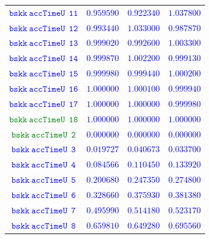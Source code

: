 \documentclass[10pt,a4paper]{article}
\begin{document}
\begin{table}[h!]
{\begin{tabular}{cccc}
\textcolor{blue}{$\mathtt{bskk~accTimeU~~11}$} & \textcolor{blue}{$0.959590$}& \textcolor{blue}{$0.922340$}& \textcolor{blue}{$1.037800$}\\
\textcolor{blue}{$\mathtt{bskk~accTimeU~~12}$} & \textcolor{blue}{$0.993440$}& \textcolor{blue}{$1.033000$}& \textcolor{blue}{$0.987870$}\\
\textcolor{blue}{$\mathtt{bskk~accTimeU~~13}$} & \textcolor{blue}{$0.999020$}& \textcolor{blue}{$0.992600$}& \textcolor{blue}{$1.003300$}\\
\textcolor{blue}{$\mathtt{bskk~accTimeU~~14}$} & \textcolor{blue}{$0.999870$}& \textcolor{blue}{$1.002200$}& \textcolor{blue}{$0.999130$}\\
\textcolor{blue}{$\mathtt{bskk~accTimeU~~15}$} & \textcolor{blue}{$0.999980$}& \textcolor{blue}{$0.999440$}& \textcolor{blue}{$1.000200$}\\
\textcolor{blue}{$\mathtt{bskk~accTimeU~~16}$} & \textcolor{blue}{$1.000000$}& \textcolor{blue}{$1.000100$}& \textcolor{blue}{$0.999940$}\\
\textcolor{blue}{$\mathtt{bskk~accTimeU~~17}$} & \textcolor{blue}{$1.000000$}& \textcolor{blue}{$1.000000$}& \textcolor{blue}{$0.999980$}\\
\textcolor{Green}{$\mathtt{bskk~accTimeU~~18}$} & \textcolor{blue}{$1.000000$}& \textcolor{blue}{$1.000000$}& \textcolor{blue}{$1.000000$}\\
\textcolor{Green}{$\mathtt{bskk~accTimeU~~2}$} & \textcolor{blue}{$0.000000$}& \textcolor{blue}{$0.000000$}& \textcolor{blue}{$0.000000$}\\
\textcolor{blue}{$\mathtt{bskk~accTimeU~~3}$} & \textcolor{blue}{$0.019727$}& \textcolor{blue}{$0.040673$}& \textcolor{blue}{$0.033700$}\\
\textcolor{blue}{$\mathtt{bskk~accTimeU~~4}$} & \textcolor{blue}{$0.084566$}& \textcolor{blue}{$0.110450$}& \textcolor{blue}{$0.133920$}\\
\textcolor{blue}{$\mathtt{bskk~accTimeU~~5}$} & \textcolor{blue}{$0.200680$}& \textcolor{blue}{$0.247350$}& \textcolor{blue}{$0.274800$}\\
\textcolor{blue}{$\mathtt{bskk~accTimeU~~6}$} & \textcolor{blue}{$0.328660$}& \textcolor{blue}{$0.375930$}& \textcolor{blue}{$0.381380$}\\
\textcolor{blue}{$\mathtt{bskk~accTimeU~~7}$} & \textcolor{blue}{$0.495990$}& \textcolor{blue}{$0.514180$}& \textcolor{blue}{$0.523170$}\\
\textcolor{blue}{$\mathtt{bskk~accTimeU~~8}$} & \textcolor{blue}{$0.659810$}& \textcolor{blue}{$0.649280$}& \textcolor{blue}{$0.695560$}\\

\end{tabular}}
\end{table}
\end{document}
